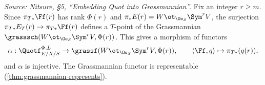 \begin{lemma}
  \label{lem:quot-embed-grassmannian}
  \textit{Source: Nitsure, §5, ``Embedding Quot into Grassmannian''.}
  Fix an integer $r \ge m$. Since $\pi_{T*}\Ff(r)$ has rank $\Phi(r)$ and
  $\pi_*E(r) = W \ot_{\Oo_S}\Sym^r V$, the surjection
  $\pi_{T*}E_T(r) \to \pi_{T*}\Ff(r)$ defines a $T$-point of the Grassmannian
  $\grasssch(W \ot_{\Oo_S}\Sym^r V, \Phi(r))$. This gives a morphism of functors
  \[
    \alpha : \Quotf_{E/X/S}^{\Phi,L} \to \grassf(W \ot_{\Oo_S}\Sym^r V, \Phi(r)),
    \qquad \langle \Ff, q\rangle \mapsto \pi_{T*}(q(r)),
  \]
  and $\alpha$ is injective. The Grassmannian functor is representable
  (\cref{thm:grassmannian-represents}).
\end{lemma}

